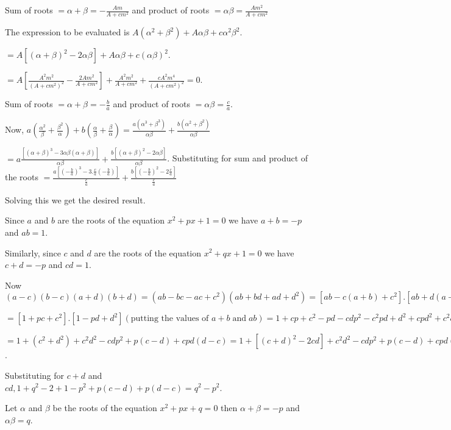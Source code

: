   Sum of roots $= \alpha + \beta = -\frac{Am}{A + cm^2}$ and product of roots $= \alpha\beta = \frac{Am^2}{A + cm^2}$

  The expression to be evaluated is $A(\alpha^2 + \beta^2) + A\alpha\beta + c\alpha^2\beta^2$.

  $= A[(\alpha + \beta)^2 - 2\alpha\beta] + A\alpha\beta + c(\alpha\beta)^2$.

  $= A\left[\frac{A^2m^2}{(A + cm^2)^2} - \frac{2Am^2}{A + cm^2}\right] + \frac{A^2m^2}{A + cm^2} + \frac{cA^2m^4}{(A +
    cm^2)^2} = 0$.
\item Sum of roots $= \alpha + \beta = -\frac{b}{a}$ and product of roots $= \alpha\beta = \frac{c}{a}$.

  Now, $a\left(\frac{\alpha^2}{\beta} + \frac{\beta^2}{\alpha}\right) + b\left(\frac{\alpha}{\beta} +
  \frac{\beta}{\alpha}\right) = \frac{a(\alpha^3 + \beta^3)}{\alpha\beta} + \frac{b(\alpha^2 +
    \beta^2)}{\alpha\beta}$

  $= a\frac{[(\alpha + \beta)^3 - 3\alpha\beta(\alpha + \beta)]}{\alpha\beta} + \frac{b[(\alpha + \beta)^2 -
      2\alpha\beta]}{\alpha\beta}$. Substituting for sum and product of the roots $=
  \frac{a\left[\left(-\frac{b}{a}\right)^3 - 3.\frac{c}{a}\left(-\frac{b}{a}\right)\right]}{\frac{c}{a}} +
  \frac{b\left[\left(-\frac{b}{a}\right)^2 -2 \frac{c}{a}\right]}{\frac{c}{a}}$

  Solving this we get the desired result.
\item Since $a$ and $b$ are the roots of the equation $x^2 + px + 1 = 0$ we have $a + b = -p$ and $ab = 1$.

  Similarly, since $c$ and $d$ are the roots of the equation $x^2 + qx + 1 = 0$ we have $c + d = -p$ and
  $cd = 1$.

  Now $(a - c)(b - c)(a + d)(b + d) = (ab - bc - ac + c^2)(ab + bd + ad + d^2) = [ab - c(a + b) + c^2].[ab +
    d(a + b) + d^2]$

  $= [1 + pc + c^2].[1 - pd + d^2] (\text{putting the values of } a + b\;\text{and}\;ab) = 1 + cp + c^2 - pd -
  cdp^2 - c^2pd + d^2 + cpd^2 + c^2d^2$

  $= 1 + (c^2 + d^2) + c^2d^2 -cdp^2 + p(c - d) + cpd(d - c) = 1 + [(c + d)^2 - 2cd] + c^2d^2 - cdp^2 + p(c
  - d) + cpd(d - c)$.

  Substituting for $c + d$ and $cd, 1 + q^2 - 2 + 1 - p^2 + p(c - d) + p(d - c) = q^2 - p^2$.
\item Let $\alpha$ and $\beta$ be the roots of the equation $x^2 + px + q = 0$ then $\alpha + \beta = -p$ and
  $\alpha\beta = q$.

